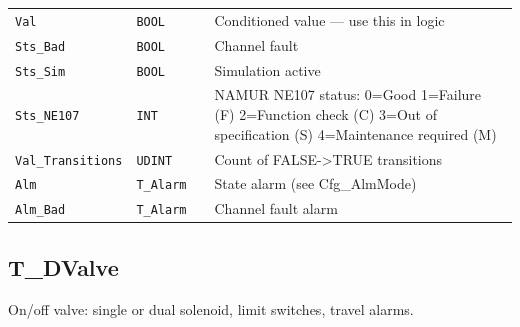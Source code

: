 \begin{small}
\begin{longtable}{@{}P{3.70cm}P{2.20cm}P{1.70cm}P{8.91cm}@{}}
\texttt{Val} & \texttt{BOOL} &  & Conditioned value --- use this in logic \\
\texttt{Sts\_Bad} & \texttt{BOOL} &  & Channel fault \\
\texttt{Sts\_Sim} & \texttt{BOOL} &  & Simulation active \\
\texttt{Sts\_NE107} & \texttt{INT} &  & NAMUR NE107 status: 0=Good 1=Failure (F) 2=Function check (C) 3=Out of specification (S) 4=Maintenance required (M) \\
\texttt{Val\_Transitions} & \texttt{UDINT} &  & Count of FALSE-\textgreater{}TRUE transitions \\
\texttt{Alm} & \texttt{T\_Alarm} &  & State alarm (see Cfg\_AlmMode) \\
\texttt{Alm\_Bad} & \texttt{T\_Alarm} &  & Channel fault alarm \\
\bottomrule
\end{longtable}
\end{small}

\subsection{T\_DValve}\label{sec:pclib-t-dvalve}

On/\allowbreak{}off valve: single or dual solenoid, limit switches, travel alarms.

\par{}\par

